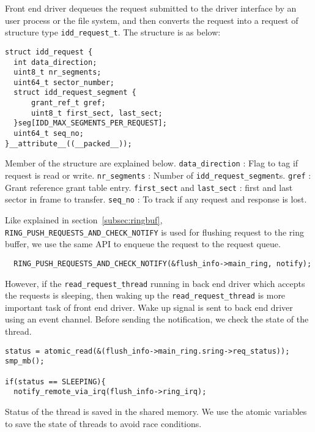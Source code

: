 Front end driver dequeues the request submitted to the driver interface by an user process or the file system, and then converts the request into a request of structure type \texttt{idd\_request\_t}. The structure is as below:

\begin{verbatim}
struct idd_request {
  int data_direction; 
  uint8_t nr_segments;
  uint64_t sector_number;
  struct idd_request_segment {
      grant_ref_t gref;
      uint8_t first_sect, last_sect;
  }seg[IDD_MAX_SEGMENTS_PER_REQUEST];
  uint64_t seq_no;
}__attribute__((__packed__));
\end{verbatim}

Member of the structure are explained below.
\texttt{data\_direction} : Flag to tag if request is read or write.
\texttt{nr\_segments} : Number of \texttt{idd\_request\_segment}s.
\texttt{gref} : Grant reference\/ grant table entry.
\texttt{first\_sect} and \texttt{last\_sect} : first and last sector in frame to transfer.
\texttt{seq\_no} : To track if any request and response is lost.


Like explained in section~\ref{subsec:ringbuf}, \texttt{RING\_PUSH\_REQUESTS\_AND\_CHECK\_NOTIFY} is used for flushing request to the ring buffer, we use the same API to enqueue the request to the request queue.
\begin{verbatim}
  RING_PUSH_REQUESTS_AND_CHECK_NOTIFY(&flush_info->main_ring, notify);
\end{verbatim}
However, if the \texttt{read\_request\_thread} running in back end driver which accepts the requests is sleeping, then waking up the \texttt{read\_request\_thread} is more important task of front end driver. Wake up signal is sent to back end driver using an event channel. Before sending the notification, we check the state of the thread.
\begin{verbatim}
status = atomic_read(&(flush_info->main_ring.sring->req_status));
smp_mb();

if(status == SLEEPING){
  notify_remote_via_irq(flush_info->ring_irq); 
\end{verbatim}
Status of the thread is saved in the shared memory. We use the atomic variables to save the state of threads to avoid race conditions. 


